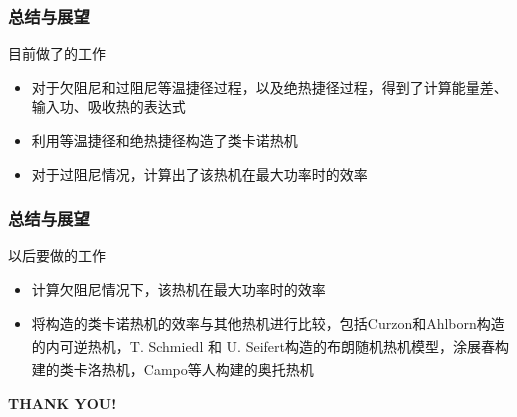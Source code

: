 \documentclass{beamer}
\newcommand{\upcite}[1]{\textsuperscript{\cite{#1}}}  %
\begin{document}
\begin{frame}
    \frametitle{总结与展望}
\begin{alertblock}{目前做了的工作}
\begin{itemize}
    \item<2-> 对于欠阻尼和过阻尼等温捷径过程，以及绝热捷径过程，得到了计算能量差、输入功、吸收热的表达式
    \item<3-> 利用等温捷径和绝热捷径构造了类卡诺热机
    \item<4-> 对于过阻尼情况，计算出了该热机在最大功率时的效率 
\end{itemize}
\end{alertblock}
\end{frame}

\begin{frame}
    \frametitle{总结与展望}
\begin{alertblock}{以后要做的工作}
\begin{itemize}
    \item<2-> 计算欠阻尼情况下，该热机在最大功率时的效率
    \item<3-> 将构造的类卡诺热机的效率与其他热机进行比较，包括Curzon和Ahlborn构造的内可逆热机\upcite{Curzon1975}，T. Schmiedl 和 U. Seifert构造的布朗随机热机模型\upcite{Schmiedl2008}，涂展春构建的类卡洛热机\upcite{Tu2013}，Campo等人构建的奥托热机\upcite{DelCampo2014}
\end{itemize}
\end{alertblock}
\end{frame}

\begin{frame}
\begin{center} 
   \LARGE \textbf{THANK YOU!}
\end{center}
\end{frame}


\footnotesize

   
\end{document}

